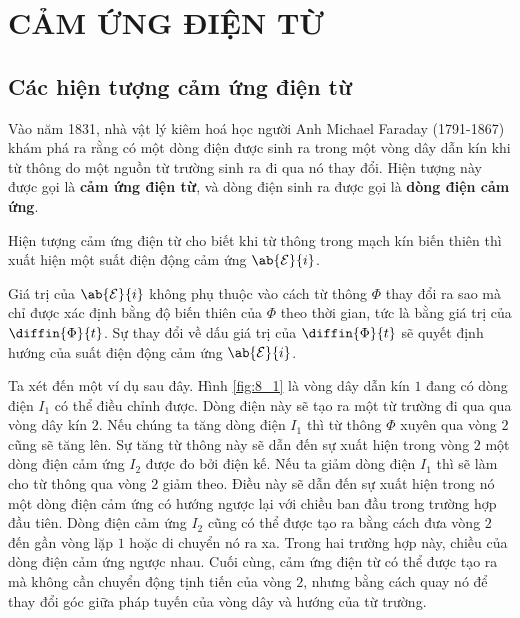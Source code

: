 

\chapter[CẢM ỨNG ĐIỆN TỪ]{CẢM ỨNG ĐIỆN TỪ}\label{chap:8}

\section{Các hiện tượng cảm ứng điện từ}\label{sec:8_1}

Vào năm 1831, nhà vật lý kiêm hoá học người Anh Michael Faraday (1791-1867) khám phá ra rằng có một dòng điện được sinh ra trong một vòng dây dẫn kín khi từ thông do một nguồn từ trường sinh ra đi qua nó thay đổi. 
Hiện tượng này được gọi là \textbf{cảm ứng điện từ}, và dòng điện sinh ra được gọi là \textbf{dòng điện cảm ứng}.

Hiện tượng cảm ứng điện từ cho biết khi từ thông trong mạch kín biến thiên thì xuất hiện một suất điện động cảm ứng $\ab{\mathcal{E}}{i}$.

Giá trị của $\ab{\mathcal{E}}{i}$ không phụ thuộc vào cách từ thông $\Phi$ thay đổi ra sao mà chỉ được xác định bằng độ biến thiên của $\Phi$ theo thời gian, tức là bằng giá trị của $\diffin{\Phi}{t}$. Sự thay đổi về dấu giá trị của $\diffin{\Phi}{t}$ sẽ quyết định hướng của suất điện động cảm ứng $\ab{\mathcal{E}}{i}$.

Ta xét đến một ví dụ sau đây.
Hình \ref{fig:8_1} là vòng dây dẫn kín $1$ đang có dòng điện $I_1$ có thể điều chỉnh được.
Dòng điện này sẽ tạo ra một từ trường đi qua qua vòng dây kín $2$.
Nếu chúng ta tăng dòng điện $I_1$ thì từ thông $\Phi$ xuyên qua vòng $2$ cũng sẽ tăng lên.
Sự tăng từ thông này sẽ dẫn đến sự xuất hiện trong vòng $2$ một dòng điện cảm ứng $I_2$ được đo bởi điện kế.
Nếu ta giảm dòng điện $I_1$ thì sẽ làm cho từ thông qua vòng $2$ giảm theo.
Điều này sẽ dẫn đến sự xuất hiện trong nó một dòng điện cảm ứng có hướng ngược lại với chiều ban đầu trong trường hợp đầu tiên.
Dòng điện cảm ứng $I_2$ cũng có thể được tạo ra bằng cách đưa vòng $2$ đến gần vòng lặp $1$ hoặc di chuyển nó ra xa.
Trong hai trường hợp này, chiều của dòng điện cảm ứng ngược nhau.
Cuối cùng, cảm ứng điện từ có thể được tạo ra mà không cần chuyển động tịnh tiến của vòng $2$, nhưng bằng cách quay nó để thay đổi góc giữa pháp tuyến của vòng dây và hướng của từ trường.

